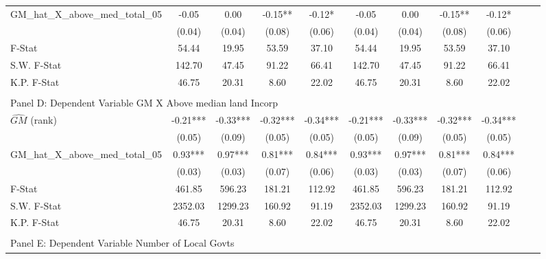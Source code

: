\begin{table}[htbp]
\begin{threeparttable}
\begin{tabular}{l*{10}{c}}
\addlinespace
GM\_hat\_X\_above\_med\_total\_05&      -0.05   &       0.00   &      -0.15** &      -0.12*  &      -0.05   &       0.00   &      -0.15** &      -0.12*  \\
                &     (0.04)   &     (0.04)   &     (0.08)   &     (0.06)   &     (0.04)   &     (0.04)   &     (0.08)   &     (0.06)   \\
\midrule
F-Stat          &      54.44   &      19.95   &      53.59   &      37.10   &      54.44   &      19.95   &      53.59   &      37.10   \\
S.W. F-Stat     &     142.70   &      47.45   &      91.22   &      66.41   &     142.70   &      47.45   &      91.22   &      66.41   \\
K.P. F-Stat     &      46.75   &      20.31   &       8.60   &      22.02   &      46.75   &      20.31   &       8.60   &      22.02   \\
\cmidrule[\heavyrulewidth](lr){1-9} \\ \cmidrule[\heavyrulewidth](lr){1-9}
\multicolumn{8}{l}{Panel D: Dependent Variable GM X Above median land Incorp}\\
\cmidrule(lr){1-9}
$\hat{GM}$ (rank)&      -0.21***&      -0.33***&      -0.32***&      -0.34***&      -0.21***&      -0.33***&      -0.32***&      -0.34***\\
                &     (0.05)   &     (0.09)   &     (0.05)   &     (0.05)   &     (0.05)   &     (0.09)   &     (0.05)   &     (0.05)   \\
\addlinespace
GM\_hat\_X\_above\_med\_total\_05&       0.93***&       0.97***&       0.81***&       0.84***&       0.93***&       0.97***&       0.81***&       0.84***\\
                &     (0.03)   &     (0.03)   &     (0.07)   &     (0.06)   &     (0.03)   &     (0.03)   &     (0.07)   &     (0.06)   \\
\midrule
F-Stat          &     461.85   &     596.23   &     181.21   &     112.92   &     461.85   &     596.23   &     181.21   &     112.92   \\
S.W. F-Stat     &    2352.03   &    1299.23   &     160.92   &      91.19   &    2352.03   &    1299.23   &     160.92   &      91.19   \\
K.P. F-Stat     &      46.75   &      20.31   &       8.60   &      22.02   &      46.75   &      20.31   &       8.60   &      22.02   \\
\cmidrule[\heavyrulewidth](lr){1-9} \\ \cmidrule[\heavyrulewidth](lr){1-9}
\multicolumn{8}{l}{Panel E: Dependent Variable Number of Local Govts}\\

\end{tabular}
\end{threeparttable}
\end{table}

